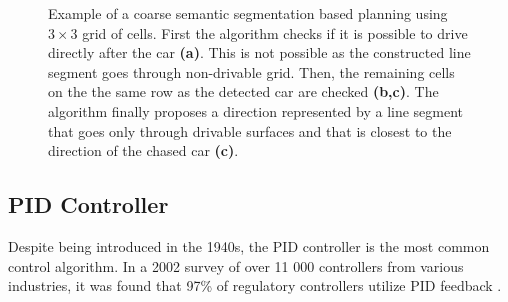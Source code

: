 \documentclass{ctuthesis/ctuthesis}
\begin{document}
\begin{figure}[]
    \centering
    \quad
    \quad
    \caption[Example of a coarse semantic segmentation based planning using $3\times 3$ grid of cells]{Example of a coarse semantic segmentation based planning using $3\times 3$ grid of cells. First the algorithm checks if it is possible to drive directly after the car \textbf{(a)}. This is not possible as the constructed line segment goes through non-drivable grid. Then, the remaining cells on the the same row as the detected car are checked \textbf{(b,c)}. The algorithm finally proposes a direction represented by a line segment that goes only through drivable surfaces and that is closest to the direction of the chased car \textbf{(c)}.}%
    \label{fig:segmentation_planning}%
\end{figure}

\subsection{PID Controller}
Despite being introduced in the 1940s, the PID controller is the most common control algorithm. In a 2002 survey of over 11 000 controllers from various industries, it was found that 97\% of regulatory controllers utilize PID feedback \cite{PID-usage}. 
\end{document}
